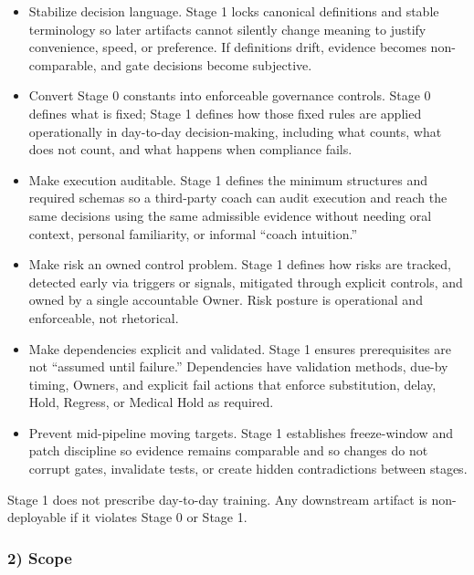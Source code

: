 \documentclass[10pt]{article}
\begin{document}
\begin{itemize}
\item Stabilize decision language. Stage 1 locks canonical definitions and stable terminology so later artifacts cannot silently change meaning to justify convenience, speed, or preference. If definitions drift, evidence becomes non-comparable, and gate decisions become subjective.

\item Convert Stage 0 constants into enforceable governance controls. Stage 0 defines what is fixed; Stage 1 defines how those fixed rules are applied operationally in day-to-day decision-making, including what counts, what does not count, and what happens when compliance fails.

\item Make execution auditable. Stage 1 defines the minimum structures and required schemas so a third-party coach can audit execution and reach the same decisions using the same admissible evidence without needing oral context, personal familiarity, or informal “coach intuition.”

\item Make risk an owned control problem. Stage 1 defines how risks are tracked, detected early via triggers or signals, mitigated through explicit controls, and owned by a single accountable Owner. Risk posture is operational and enforceable, not rhetorical.

\item Make dependencies explicit and validated. Stage 1 ensures prerequisites are not “assumed until failure.” Dependencies have validation methods, due-by timing, Owners, and explicit fail actions that enforce substitution, delay, Hold, Regress, or Medical Hold as required.

\item Prevent mid-pipeline moving targets. Stage 1 establishes freeze-window and patch discipline so evidence remains comparable and so changes do not corrupt gates, invalidate tests, or create hidden contradictions between stages.
\end{itemize}

Stage 1 does not prescribe day-to-day training. Any downstream artifact is non-deployable if it violates Stage 0 or Stage 1.

\subsubsection*{2) Scope}
\end{document}
